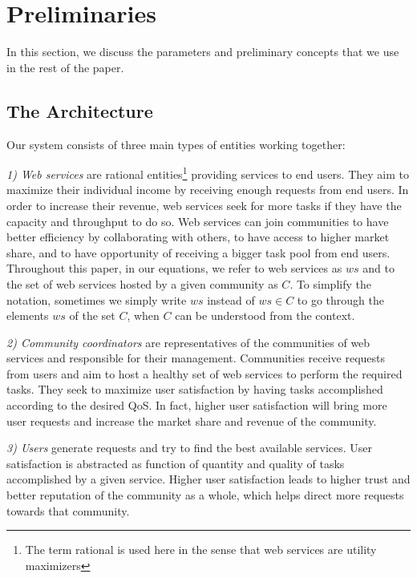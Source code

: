 \documentclass[10pt,journal,cspaper,compsoc]{IEEEtran}
\begin{document}



\section{Preliminaries}\label{s:preliminaries}

In this section, we discuss the parameters and preliminary
concepts that we use in the rest of the paper.

\subsection{The Architecture}

Our system consists of three main types of entities working
together:

\emph{1) Web services} are rational entities\footnote{The term
rational is used here in the sense that web services are utility
maximizers} providing services to end users. They aim to maximize
their individual income by receiving enough requests from end
users. In order to increase their revenue, web services seek for
more tasks if they have the capacity and throughput to do so. Web
services can join communities to have better efficiency by
collaborating with others, to have access to higher market share,
and to have opportunity of receiving a bigger task pool from end
users. Throughout this paper, in our equations, we refer to web
services as $ws$ and to the set of web services hosted by a given
community as $C$. To simplify the notation, sometimes we simply
write $ws$ instead of $ws \in C$ to go through the elements $ws$
of the set $C$, when $C$ can be understood from the context.

\emph{2) Community coordinators} are
representatives of the communities of web services and responsible
for their management. Communities receive requests from users and
aim to host a healthy set of web services to perform the required
tasks. They seek to maximize user satisfaction by having tasks
accomplished according to the desired QoS. In fact, higher user
satisfaction will bring more user requests and increase the market
share and revenue of the community.

\emph{3) Users} generate requests and try to find the best
available services. User satisfaction is abstracted as function of
quantity and quality of tasks accomplished by a given service.
Higher user satisfaction leads to higher trust and better
reputation of the community as a whole, which helps direct more
requests towards that community.
\end{document}
